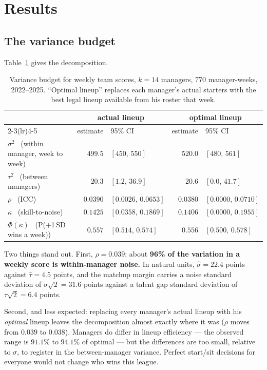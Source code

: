 \documentclass[11pt]{article}
\begin{document}
\section{Results}

\subsection{The variance budget}\label{sec:budget}

Table~\ref{tab:budget} gives the decomposition.

\begin{table}[h]
\centering\small
\begin{tabular}{lrlrl}
\toprule
& \multicolumn{2}{c}{actual lineup} & \multicolumn{2}{c}{optimal lineup} \\
\cmidrule(lr){2-3}\cmidrule(lr){4-5}
& estimate & 95\% CI & estimate & 95\% CI \\
\midrule
$\sigma^2$ \ (within manager, week to week) & $499.5$ & $[450,\,550]$ & $520.0$ & $[480,\,561]$ \\
$\tau^2$ \ (between managers)               & $20.3$  & $[1.2,\,36.9]$ & $20.6$ & $[0.0,\,41.7]$ \\
$\rho$ \ (ICC)                              & $0.0390$ & $[0.0026,\,0.0653]$ & $0.0380$ & $[0.0000,\,0.0710]$ \\
$\kappa$ \ (skill-to-noise)                 & $0.1425$ & $[0.0358,\,0.1869]$ & $0.1406$ & $[0.0000,\,0.1955]$ \\
$\Phi(\kappa)$ \ (P(+1\,SD wins a week))    & $0.557$ & $[0.514,\,0.574]$ & $0.556$ & $[0.500,\,0.578]$ \\
\bottomrule
\end{tabular}
\caption{Variance budget for weekly team scores, $k=14$ managers, 770
manager-weeks, 2022--2025. ``Optimal lineup'' replaces each manager's actual
starters with the best legal lineup available from his roster that week.}
\label{tab:budget}
\end{table}

Two things stand out. First, $\rho = 0.039$: about \textbf{96\% of the variation
in a weekly score is within-manager noise.} In natural units,
$\widehat\sigma = 22.4$ points against $\widehat\tau = 4.5$ points, and the
matchup margin carries a noise standard deviation of
$\sigma\sqrt2 = 31.6$ points against a talent gap standard deviation of
$\tau\sqrt2 = 6.4$ points.

Second, and less expected: replacing every manager's actual lineup with his
\emph{optimal} lineup leaves the decomposition almost exactly where it was
($\rho$ moves from $0.039$ to $0.038$). Managers do differ in lineup efficiency
--- the observed range is $91.1\%$ to $94.1\%$ of optimal --- but the differences
are too small, relative to $\sigma$, to register in the between-manager variance.
Perfect start/sit decisions for everyone would not change who wins this league.
\end{document}
